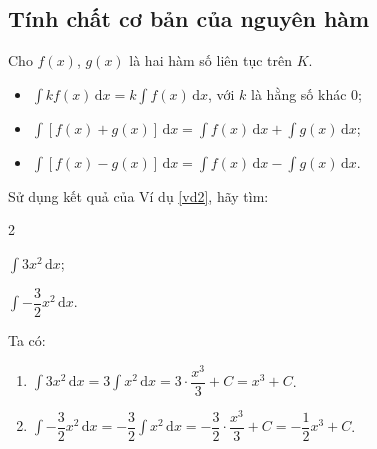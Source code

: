 \documentclass[12pt,aspectratio=169]{beamer}
\begin{document}
\subsection{Tính chất cơ bản của nguyên hàm}

\begin{tomtat}
	\begin{tc}
		Cho $f(x)$, $g(x)$ là hai hàm số liên tục trên $K$.
		\begin{itemize}
			\item $\displaystyle\int k f(x)\mathrm{\,d}x=k\displaystyle\int f(x)\mathrm{\,d}x$, với $k$ là hằng số khác $0$;
			\item $\displaystyle\int\left[f(x)+g(x)\right]\mathrm{\,d}x=\int f(x)\mathrm{\,d}x+\int g(x)\mathrm{\,d}x$;
			\item $\displaystyle \int\left[f(x)-g(x)\right]\mathrm{\,d}x=\int f(x)\mathrm{\,d}x-\int g(x)\mathrm{\,d}x$.
		\end{itemize}
	\end{tc}
\end{tomtat}

\begin{vd}
	Sử dụng kết quả của Ví dụ \ref{vd2}, hãy tìm:
	\begin{enumEX}{2}
		\item $\displaystyle\int 3x^2\mathrm{\,d}x$;
		\item $\displaystyle\int -\dfrac{3}{2}x^2\mathrm{\,d}x$.
	\end{enumEX}

	\begin{loigiai}
		Ta có:
		\begin{enumerate}
			\item $\displaystyle\int 3x^2\mathrm{\,d}x = 3\displaystyle\int x^2\mathrm{\,d}x = 3\cdot\dfrac{x^3}{3}+C=x^3+C$.
			\item $\displaystyle\int -\dfrac{3}{2}x^2\mathrm{\,d}x = -\dfrac{3}{2}\displaystyle\int x^2\mathrm{\,d}x=-\dfrac{3}{2}\cdot\dfrac{x^3}{3}+C=-\dfrac{1}{2}x^3+C$.
		\end{enumerate}
	\end{loigiai}
\end{vd}
\end{document}
